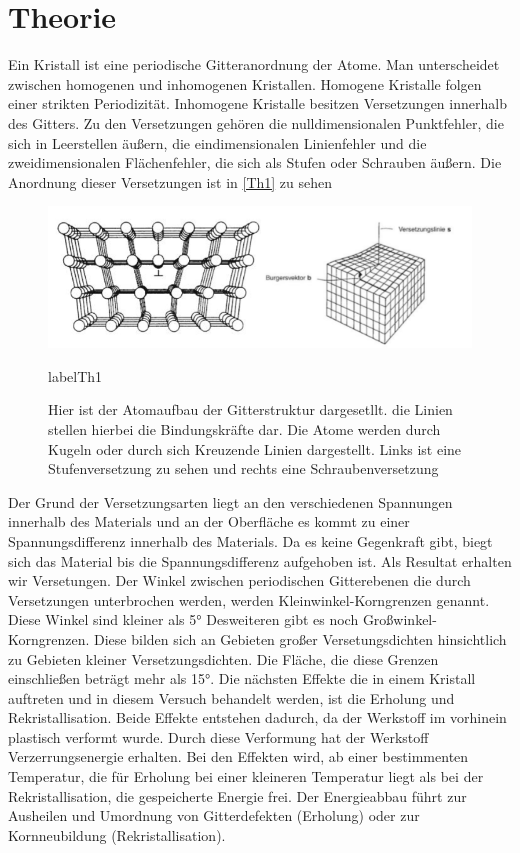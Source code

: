 \documentclass[
	a4paper,
	12pt,
	pagesize,
	ngerman
]{scrartcl}
\begin{document}
\section{Theorie}
Ein Kristall ist eine periodische Gitteranordnung der Atome. Man unterscheidet zwischen homogenen und inhomogenen Kristallen. Homogene Kristalle folgen einer strikten Periodizität. Inhomogene Kristalle besitzen Versetzungen innerhalb des Gitters. Zu den Versetzungen gehören die nulldimensionalen Punktfehler, die sich in Leerstellen äußern, die eindimensionalen Linienfehler und die zweidimensionalen Flächenfehler, die sich als Stufen oder Schrauben äußern. Die Anordnung dieser Versetzungen ist in \cref{Th1} zu sehen
\begin{figure}[h]
	\centering
	\includegraphics[scale=0.6]{theorie.png}
	\caption{Hier ist der Atomaufbau der Gitterstruktur dargesetllt. die Linien stellen hierbei die Bindungskräfte dar. Die Atome werden durch Kugeln oder durch sich Kreuzende Linien dargestellt.	Links ist eine Stufenversetzung zu sehen und rechts eine Schraubenversetzung}
	label{Th1}
\end{figure}
Der Grund der Versetzungsarten liegt an den verschiedenen Spannungen innerhalb des Materials und an der Oberfläche es kommt zu einer Spannungsdifferenz innerhalb des Materials. Da es keine Gegenkraft gibt, biegt sich das Material bis die Spannungsdifferenz aufgehoben ist. Als Resultat erhalten wir Versetungen. Der Winkel zwischen periodischen Gitterebenen die durch Versetzungen unterbrochen werden, werden Kleinwinkel-Korngrenzen genannt. Diese Winkel sind kleiner als 5°
Desweiteren gibt es noch Großwinkel-Korngrenzen. Diese bilden sich an Gebieten großer Versetungsdichten hinsichtlich zu Gebieten kleiner Versetzungsdichten. Die Fläche, die diese Grenzen einschließen beträgt mehr als 15°.
Die nächsten Effekte die in einem Kristall auftreten und in diesem Versuch behandelt werden, ist die Erholung und Rekristallisation. 
Beide Effekte entstehen dadurch, da der Werkstoff im vorhinein plastisch verformt wurde. Durch diese Verformung hat der Werkstoff Verzerrungsenergie erhalten. Bei den Effekten wird, ab einer bestimmenten Temperatur, die für Erholung bei einer kleineren Temperatur liegt als bei der Rekristallisation, die gespeicherte Energie frei. Der Energieabbau führt zur Ausheilen und Umordnung von Gitterdefekten (Erholung) oder zur Kornneubildung (Rekristallisation).
\end{document}
